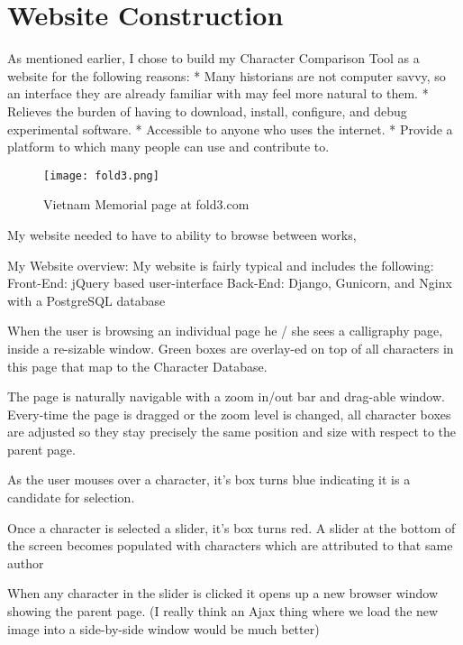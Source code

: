 \chapter{Website Construction}

As mentioned earlier, I chose to build my Character Comparison Tool as a website for the following reasons:
    * Many historians are not computer savvy, so an interface they are already familiar with may feel more natural to them.
    * Relieves the burden of having to download, install, configure, and debug experimental software.
    * Accessible to anyone who uses the internet.
    * Provide  a platform to which many people can use and contribute to.
    
    \begin{figure}{}
    \parbox{12cm}{\texttt{[image: fold3.png]}}
    \caption{Vietnam Memorial page at fold3.com}
    \label{Vietnam Memorial inspiration}
    \end{figure}
    
    My website needed to have to ability to browse between works, 
    
        My Website overview:
            My website is fairly typical and includes the following:
                Front-End:  jQuery based user-interface
                Back-End:   Django, Gunicorn, and Nginx with a PostgreSQL database
                
            When the user is browsing an individual page he / she sees a calligraphy page, inside a re-sizable window.
                Green boxes are overlay-ed on top of all characters in this page that map to the Character Database.
                
                The page is naturally navigable with a zoom in/out bar and drag-able window.
                Every-time the page is dragged or the zoom level is changed, all character boxes are adjusted so they stay precisely the same position and size with respect to the parent page.
                
                As the user mouses over a character, it's box turns blue indicating it is a candidate for selection.
                
                Once a character is selected a slider, it's box turns red. A slider at the bottom of the screen becomes populated with characters which are attributed to that same author
                
                When any character in the slider is clicked it opens up a new browser window showing the parent page.  (I really think an Ajax thing where we load the new image into a side-by-side window would be much better)
                
